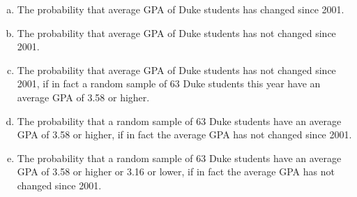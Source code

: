\documentclass[11pt,containsverbatim,handout,xcolor=xelatex,dvipsnames,table]{beamer}
\newcommand{\solnMult}[1]{#1}
\begin{document}

\begin{frame}


\begin{enumerate}[(a)]
\item The probability that average GPA of Duke students has changed since 2001.
\item The probability that average GPA of Duke students has not changed since 2001.
\item The probability that average GPA of Duke students has not changed since 2001, if in fact a random sample of 63 Duke students this year have an average GPA of 3.58 or higher.
\item The probability that a random sample of 63 Duke students have an average GPA of 3.58 or higher, if in fact the average GPA has not changed since 2001.
\item \solnMult{The probability that a random sample of 63 Duke students have an average GPA of 3.58 or higher or 3.16 or lower, if in fact the average GPA has not changed since 2001.}
\end{enumerate}

\end{frame}

\end{document}
